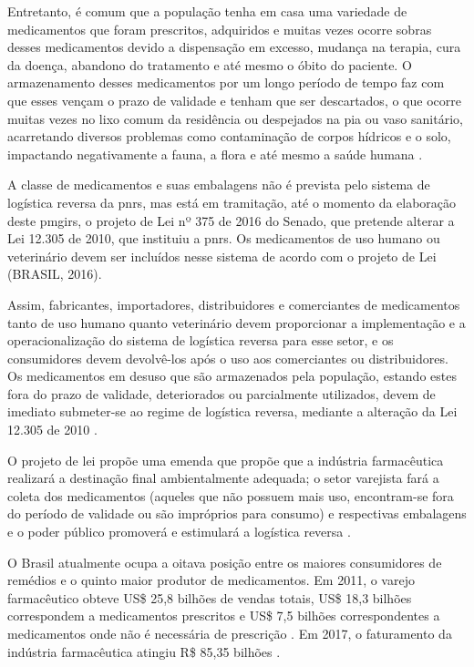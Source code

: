 \begin{description}
	Entretanto, é comum que a população tenha em casa uma variedade de medicamentos que foram prescritos, adquiridos e muitas vezes ocorre sobras desses medicamentos devido a dispensação em excesso, mudança na terapia, cura da doença, abandono do tratamento e até mesmo o óbito do paciente. O armazenamento desses medicamentos por um longo período de tempo faz com que esses vençam o prazo de validade e tenham que ser descartados, o que ocorre muitas vezes no lixo comum da residência ou despejados na pia ou vaso sanitário, acarretando diversos problemas como contaminação de corpos hídricos e o solo, impactando negativamente a fauna, a flora e até mesmo a saúde humana \cite{Medeiros2014}.
	
	A classe de medicamentos e suas embalagens não é prevista pelo sistema de logística reversa da \gls{pnrs}, mas está em tramitação, até o momento da elaboração deste \gls{pmgirs}, o projeto de Lei nº 375 de 2016 do Senado, que pretende alterar a Lei 12.305 de 2010, que instituiu a \gls{pnrs}. Os medicamentos de uso humano ou veterinário devem ser incluídos nesse sistema de acordo com o projeto de Lei (BRASIL, 2016).
	
	Assim, fabricantes, importadores, distribuidores e comerciantes de medicamentos tanto de uso humano quanto veterinário devem proporcionar a implementação e a operacionalização do sistema de logística reversa para esse setor, e os consumidores devem devolvê-los após o uso aos comerciantes ou distribuidores. Os medicamentos em desuso que são armazenados pela população, estando estes fora do prazo de validade, deteriorados ou parcialmente utilizados, devem de imediato submeter-se ao regime de logística reversa, mediante a alteração da Lei 12.305 de 2010 \cite{brasil:12305}.
	
	O projeto de lei propõe uma emenda que propõe que a indústria farmacêutica realizará a destinação final ambientalmente adequada; o setor varejista fará a coleta dos medicamentos (aqueles que não possuem mais uso, encontram-se fora do período de validade ou são impróprios para consumo) e respectivas embalagens e o poder público promoverá e estimulará a logística reversa \cite{pl148}.
	
	O Brasil atualmente ocupa a oitava posição entre os maiores consumidores de remédios e o quinto maior produtor de medicamentos. Em 2011, o varejo farmacêutico obteve US\$ 25,8 bilhões de vendas totais, US\$ 18,3 bilhões correspondem a medicamentos prescritos e US\$ 7,5 bilhões correspondentes a medicamentos onde não é necessária de prescrição \cite{pwc2013}. Em 2017, o faturamento da indústria farmacêutica atingiu R\$ 85,35 bilhões \cite{INTERFARMA2017}.
	

\end{description}
